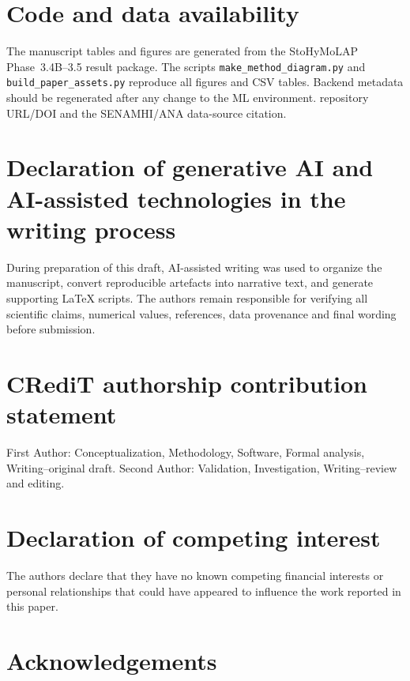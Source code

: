 \documentclass[a4paper,fleqn]{cas-sc}
\begin{document}
\section*{Code and data availability}

The manuscript tables and figures are generated from the StoHyMoLAP
Phase~3.4B--3.5 result package. The scripts
\texttt{make\_method\_diagram.py} and \texttt{build\_paper\_assets.py}
reproduce all figures and CSV tables. Backend metadata should be
regenerated after any change to the ML environment. %
repository URL/DOI and the SENAMHI/ANA data-source citation.

\section*{Declaration of generative AI and AI-assisted technologies
in the writing process}

During preparation of this draft, AI-assisted writing was used to
organize the manuscript, convert reproducible artefacts into narrative
text, and generate supporting LaTeX scripts. The authors remain
responsible for verifying all scientific claims, numerical values,
references, data provenance and final wording before submission.

\section*{CRediT authorship contribution statement}

First Author: Conceptualization, Methodology, Software, Formal
analysis, Writing--original draft. Second Author: Validation,
Investigation, Writing--review and editing.

\section*{Declaration of competing interest}

The authors declare that they have no known competing financial
interests or personal relationships that could have appeared to
influence the work reported in this paper.

\section*{Acknowledgements}

\printcredits




\end{document}
